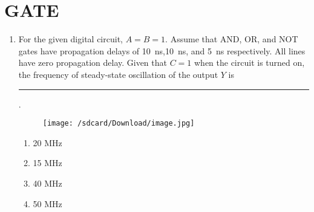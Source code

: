 \documentclass[12pt]{article}
\begin{document}
\section*{GATE}
\begin{enumerate}
\item For the given digital circuit, $A = B = 1$. Assume that AND, OR, and NOT gates have propagation delays of \SI{10}{\nano\second},\SI{10}{\nano\second}, and \SI{5}{\nano\second} respectively. All lines have zero
propagation delay. Given that $C = 1$ when the circuit is turned on, the frequency of steady-state oscillation of the output $Y$  is  \rule{30pt}{1pt}.
\begin{figure}[!h]
        \centering        
        \texttt{[image: /sdcard/Download/image.jpg]}
\end{figure}
    \begin{enumerate}
        \item 20 MHz
        \item 15 MHz
        \item 40 MHz
        \item 50 MHz
    \end{enumerate}
  \end{enumerate}
\end{document}
